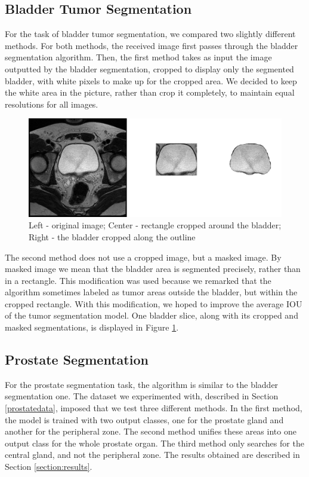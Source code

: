 \documentclass[runningheads,a4paper,11pt]{report}
\begin{document}
\subsection{Bladder Tumor Segmentation}\label{tumorsegm}

For the task of bladder tumor segmentation, we compared two slightly different methods. For both methods, the received image first passes through the bladder segmentation algorithm. Then, the first method takes as input the image outputted by the bladder segmentation, cropped to display only the segmented bladder, with white pixels to make up for the cropped area. We decided to keep the white area in the picture, rather than crop it completely, to maintain equal resolutions for all images. 

\begin{figure}[htbp]
	\centerline{\includegraphics[width=14cm]{images/bladder_6.png}}
	\caption{Left - original image; Center - rectangle cropped around the bladder; Right - the bladder cropped along the outline}
	\label{bladder_6}
\end{figure}

The second method does not use a cropped image, but a masked image. By masked image we mean that the bladder area is segmented precisely, rather than in a rectangle. This modification was used because we remarked that the algorithm sometimes labeled as tumor areas outside the bladder, but within the cropped rectangle. With this modification, we hoped to improve the average IOU of the tumor segmentation model. One bladder slice, along with its cropped and masked segmentations, is displayed in Figure \ref{bladder_6}.

\subsection{Prostate Segmentation}\label{prostatesegm}

For the prostate segmentation task, the algorithm is similar to the bladder segmentation one. The dataset we experimented with, described in Section \ref{prostatedata}, imposed that we test three different methods. In the first method, the model is trained with two output classes, one for the prostate gland and another for the peripheral zone. The second method unifies these areas into one output class for the whole prostate organ. The third method only searches for the central gland, and not the peripheral zone. The results obtained are described in Section \ref{section:results}.
\end{document}
